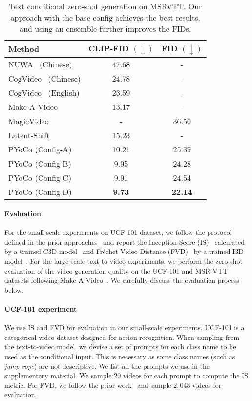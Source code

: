 \documentclass[10pt,twocolumn,letterpaper]{article}
\begin{document}
\begin{table}[t!]
\caption{Text conditional zero-shot generation on MSRVTT. Our approach with the base config achieves the best results, and using an ensemble further improves the FIDs.}
\label{tab:msrvtt_zeroshot}
\centering
\begin{tabular}{lcc}
\toprule
Method             & CLIP-FID  $(\downarrow)$   & FID $(\downarrow)$ \\
\midrule
NUWA~\cite{wu2022nuwa} (Chinese)     & 47.68 & - \\
CogVideo~\cite{hong2022cogvideo} (Chinese) & 24.78 & - \\
CogVideo~\cite{hong2022cogvideo} (English) & 23.59 & - \\
Make-A-Video~\cite{singer2022make}  & 13.17 & - \\
MagicVideo~\cite{zhou2022magicvideo} & - & 36.50 \\
Latent-Shift~\cite{an2023latent} & 15.23 & - \\
\rowcolor[HTML]{DFDFDF} PYoCo (Config-A) & 10.21 & 25.39 \\
\rowcolor[HTML]{DFDFDF} PYoCo (Config-B) & 9.95  & 24.28 \\
\rowcolor[HTML]{DFDFDF} PYoCo (Config-C) & 9.91  & 24.54 \\
\rowcolor[HTML]{DFDFDF} PYoCo (Config-D) & \textbf{9.73}  & \textbf{22.14} \\
\bottomrule
\end{tabular}
\end{table}
 
\paragraph{Evaluation} For the small-scale experiments on UCF-101 dataset, we follow the protocol defined in the prior approaches~\cite{tian2021a,skorokhodov2021stylegan,ho2022video} and report the Inception Score (IS)~\cite{saito2020train} calculated by a trained C3D model~\cite{tran2015learning} and Fréchet Video Distance (FVD)~\cite{unterthiner2018towards} by a trained I3D model~\cite{carreira2017quo}. For the large-scale text-to-video experiments, we perform the zero-shot evaluation of the video generation quality on the UCF-101 and MSR-VTT datasets following Make-A-Video~\cite{singer2022make}. We carefully discuss the evaluation process below.


\paragraph{UCF-101 experiment} We use IS and FVD for evaluation in our small-scale experiments. UCF-101 is a categorical video dataset designed for action recognition. When sampling from the text-to-video model, we devise a set of prompts for each class name to be used as the conditional input. This is necessary as some class names (such as \textit{jump rope}) are not descriptive. We list all the prompts we use in the supplementary material. We sample $20$ videos for each prompt to compute the IS metric. For FVD, we follow the prior work~\cite{le2021ccvs,tian2021a} and sample $2,048$ videos for evaluation.
\end{document}
